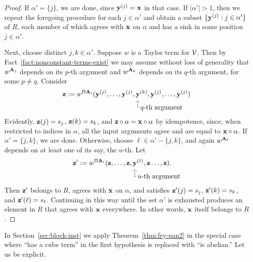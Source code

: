 \begin{proof}
  If $\alpha' = \{j\}$, we are done, since $\mathbf{y}^{(j)} = \mathbf{x}$ in that case.
  If $|\alpha'|>1$, then we repeat the foregoing procedure for each 
  $j \in \alpha'$ and obtain a subset $\{\mathbf{y}^{(j)} : j \in \alpha'\}$ of $R$,
  each member of which agrees with $\mathbf{x}$ on $\alpha$ and has a sink in some position
  $j\in \alpha'$. 

  Next, choose distinct $j, k \in \alpha'$. Suppose $w$ is a Taylor term for $\mathcal{V}$.
  Then by Fact~\ref{fact:nonconstant-terms-exist} we may assume without loss of
  generality that $w^{\mathbf{A}_j}$ depends on its $p$-th argument and $w^{\mathbf{A}_k}$ depends
  on its $q$-th argument, for some $p\neq q$. Consider
  \begin{align*}
    \bz:= w^{\Pi \bA_i}(\by^{(j)}, %
    \dots, \by^{(j)}, & \, \by^{(k)}, \by^{(j)}, \dots, \by^{(j)})\\
    &\; ^{\widehat{\lfloor}} \, \text{$q$-th argument}
  \end{align*}
  Evidently, $\mathbf{z}(j) = s_j$, $\mathbf{z}(k) = s_k$, and 
  $\mathbf{z} \circ \alpha = \mathbf{x} \circ \alpha$ by idempotence, since, when restricted to
  indices in $\alpha$, all the input arguments agree and are equal to $\mathbf{x} \circ \alpha$. 
  If $\alpha' = \{j, k\}$, we are done.  Otherwise, choose
  $\ell \in \alpha'-\{j, k\}$, and again $w^{\mathbf{A}_\ell}$ depends on at
  least one of its 
  say, the $u$-th.  Let
  \begin{align*}
    \bz':= w^{\Pi \bA_i}(\bz, %
    \dots, \bz, & \, \by^{(\ell)}, \bz \dots, \bz).\\
    &\; ^{\widehat{\lfloor}} \, \text{$u$-th argument}
  \end{align*}
  Then $\mathbf{z}'$ belongs to $R$, agrees with $\mathbf{x}$ on $\alpha$, and satisfies
  $\mathbf{z}'(j) = s_j$, $\mathbf{z}'(k) = s_k$, and   $\mathbf{z}'(\ell) = s_\ell$. 
  Continuing in this way until the set $\alpha'$ is exhausted produces
  an element in $R$ that agrees with $\mathbf{x}$ everywhere. %
  In other words,  $\mathbf{x}$ itself belongs to $R$.
\end{proof}

In Section~\ref{sec:block-inst} we apply
Theorem~\ref{thm:fry-pan2} 
in the special case where
``has a cube term''  in the first hypothesis 
is replaced with ``is abelian.'' Let us be explicit.

